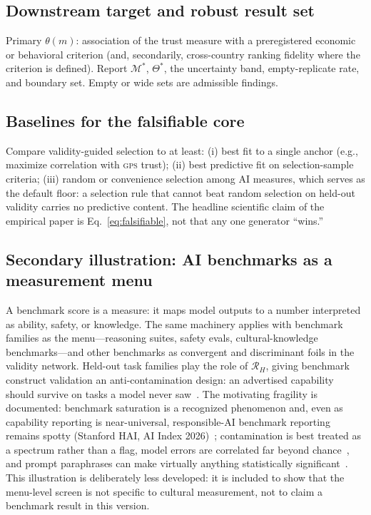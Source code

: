 \documentclass[10pt,letterpaper]{article}
\newcommand{\GPS}{\textsc{gps}}
\newcommand{\M}{\ensuremath{\mathcal{M}}}
\newcommand{\Rset}{\mathcal{R}}
\begin{document}
\subsection{Downstream target and robust result set}
Primary $\theta(m)$: association of the trust measure with a preregistered economic or behavioral criterion (and, secondarily, cross-country ranking fidelity where the criterion is defined).
Report $\M^*$, $\Theta^*$, the uncertainty band, empty-replicate rate, and boundary set.
Empty or wide sets are admissible findings.

\subsection{Baselines for the falsifiable core}
Compare validity-guided selection to at least:
(i) best fit to a single anchor (e.g., maximize correlation with \GPS{} trust);
(ii) best predictive fit on selection-sample criteria;
(iii) random or convenience selection among AI measures, which serves as the default floor: a selection rule that cannot beat random selection on held-out validity carries no predictive content.
The headline scientific claim of the empirical paper is Eq.~\eqref{eq:falsifiable}, not that any one generator ``wins.''

\subsection{Secondary illustration: AI benchmarks as a measurement menu}
A benchmark score is a measure: it maps model outputs to a number interpreted as ability, safety, or knowledge.
The same machinery applies with benchmark families as the menu---reasoning suites, safety evals, cultural-knowledge benchmarks---and other benchmarks as convergent and discriminant foils in the validity network.
Held-out task families play the role of $\Rset_H$, giving benchmark construct validation an anti-contamination design: an advertised capability should survive on tasks a model never saw~\cite{bean2025}.
The motivating fragility is documented: benchmark saturation is a recognized phenomenon and, even as capability reporting is near-universal, responsible-AI benchmark reporting remains spotty (Stanford HAI, AI Index 2026)~\cite{hai2026}; contamination is best treated as a spectrum rather than a flag, model errors are correlated far beyond chance~\cite{kim2025}, and prompt paraphrases can make virtually anything statistically significant~\cite{bauman2026}.
This illustration is deliberately less developed: it is included to show that the menu-level screen is not specific to cultural measurement, not to claim a benchmark result in this version.
\end{document}
